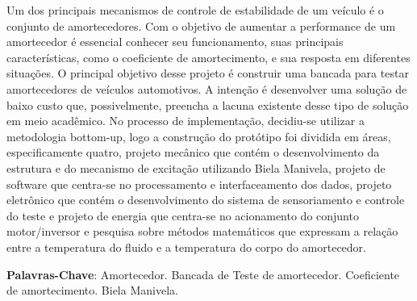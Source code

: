 \begin{resumo}[Resumo]
Um dos principais mecanismos de controle de estabilidade de um veículo é o conjunto de amortecedores. Com o objetivo de aumentar a performance de um amortecedor é essencial conhecer seu funcionamento, suas principais características, como o coeficiente de amortecimento, e sua resposta em diferentes situações. O principal objetivo desse projeto é construir uma bancada para testar amortecedores de veículos automotivos. A intenção é desenvolver uma solução de baixo custo que, possivelmente, preencha a lacuna existente desse tipo de solução em meio acadêmico. No processo de implementação, decidiu-se utilizar a metodologia bottom-up, logo a construção do protótipo foi dividida em áreas, especificamente quatro, projeto mecânico que contém o desenvolvimento da estrutura e do mecanismo de excitação utilizando Biela Manivela, projeto de software que centra-se no processamento e interfaceamento dos dados, projeto eletrônico que contém o desenvolvimento do sistema de sensoriamento e controle do teste e projeto de energia que centra-se no acionamento do conjunto motor/inversor e pesquisa sobre métodos matemáticos que expressam a relação entre a temperatura do fluido e a temperatura do corpo do amortecedor. 


   \vspace{\onelineskip}
 
   \noindent 
   
   \textbf{Palavras-Chave}: Amortecedor. Bancada de Teste de amortecedor. Coeficiente de amortecimento. Biela Manivela.

\end{resumo}
